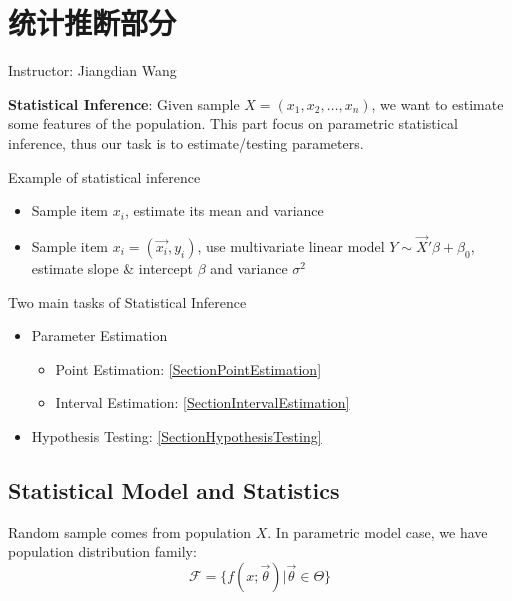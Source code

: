 \section{统计推断部分}
\begin{center}
    Instructor: Jiangdian Wang
\end{center}

    \textbf{Statistical Inference}: Given sample $ X=(x_{1},x_{2},\ldots,x_{n})  $, we want to estimate some features of the population. This part focus on parametric statistical inference, thus our task is to estimate/testing parameters.

\begin{point}
    Example of statistical inference
\end{point}

\begin{itemize}[topsep=2pt,itemsep=0pt]
    \item Sample item $ x_i $, estimate its mean and variance
    \item Sample item $ x_i=(\vec{x_i},y_i) $, use multivariate linear model $ Y\sim \vec{X}'\beta +\beta _0 $, estimate slope \& intercept $ \beta  $ and variance $ \sigma ^2 $
\end{itemize}

        
\begin{point}
    Two main tasks of Statistical Inference
\end{point}

    \begin{itemize}[topsep= 2 pt,itemsep= 0 pt,parsep= 0 pt]
        \item Parameter Estimation
        \begin{itemize}
            \item Point Estimation: {\autoref{SectionPointEstimation}}
            \item Interval Estimation: {\autoref{SectionIntervalEstimation}}
        \end{itemize}
        \item Hypothesis Testing: {\autoref{SectionHypothesisTesting}}
    \end{itemize}

\subsection{Statistical Model and Statistics}\label{SectionStatisticalModelandStatistics}
    Random sample comes from population $X$. In parametric model case, we have population distribution family:
    \begin{equation}\mathscr{F}=\{f(x;\vec{\theta})|\vec{\theta}\in\Theta\}\end{equation}

